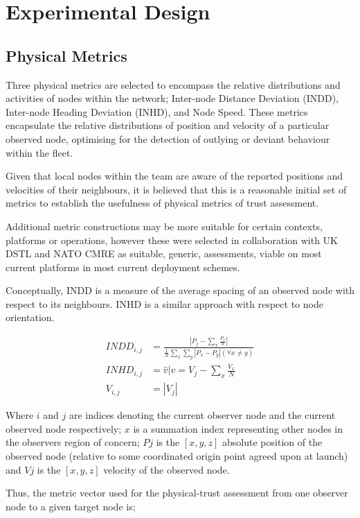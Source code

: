 \documentclass[conference]{IEEEtran}
\begin{document}
\section{Experimental Design}\label{sec:exp}

\subsection{Physical Metrics}

Three physical metrics are selected to encompass the relative distributions and activities of nodes within the network; Inter-node Distance Deviation (INDD), Inter-node Heading Deviation (INHD), and Node Speed. 
These metrics encapsulate the relative distributions of position and velocity of a particular observed node, optimising for the detection of outlying or deviant behaviour within the fleet.

Given that local nodes within the team are aware of the reported positions and velocities of their neighbours, it is believed that this is a reasonable initial set of metrics to establish the usefulness of physical metrics of trust assessment.

Additional metric constructions may be more suitable for certain contexts, platforms or operations, however these were selected in collaboration with UK DSTL and NATO CMRE as suitable, generic, assessments, viable on most current platforms in most current deployment schemes.

Conceptually, INDD is a measure of the average spacing of an observed node with respect to its neighbours. INHD is a similar approach with respect to node orientation.

\begin{align}
  INDD_{i,j} &= \frac{|P_j - \sum_x \frac{P_x}{N}|}{\frac{1}{N}\sum_x \sum_y{|P_x - P_y| (\forall x \neq y)}}\\
  INHD_{i,j} &= \hat{v} \vert v= V_j - \sum_x{\frac{V_x}{N}}\\
  V_{i,j} &= |V_j|
\end{align}

Where $i$ and $j$ are indices denoting the current observer node and the current observed node respectively; $x$ is a summation index representing other nodes in the observers region of concern; $P{j}$ is the $[x,y,z]$ absolute position of the observed node (relative to some coordinated origin point agreed upon at launch) and $V{j}$ is the $[x,y,z]$ velocity of the observed node.

Thus, the metric vector used for the physical-trust assessment from one observer node to a given target node is;
\end{document}
